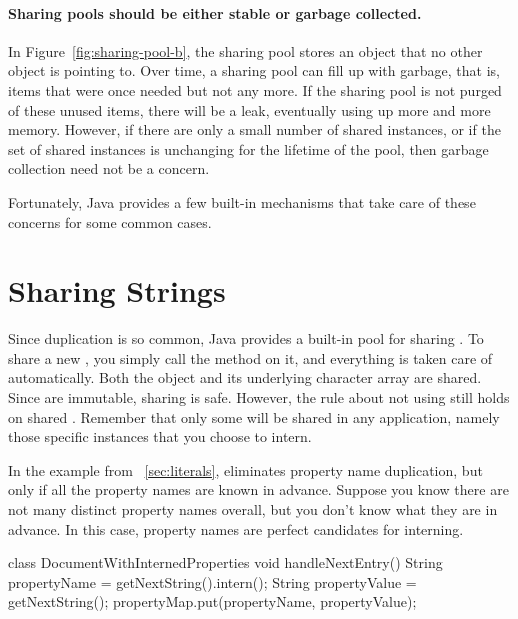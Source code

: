 \paragraph{Sharing pools should be either stable or garbage collected.} 
In Figure~\ref{fig:sharing-pool-b}, the sharing pool stores an object
that no other object is pointing to. Over time, a sharing pool can fill up with
garbage, that is, items that were once needed but not any more. If the
sharing pool is not purged of these unused items, there will be a leak, 
eventually using up more and more memory. However, if there are only a small
number of shared instances, or if the set of shared instances is unchanging for the lifetime of the pool,
then garbage collection need not be a concern.

Fortunately, Java provides a few built-in mechanisms that take care of
these concerns for some common cases.

\section{Sharing Strings}
\label{sec:sharing-strings}


Since  duplication is so common, Java provides a built-in
pool for sharing . To share a new
, you simply call the method  on it, and 
everything is taken care of automatically. Both the 
object and its underlying character array are shared. Since
 are immutable, sharing is safe.
However, the rule about not using \code{==} still holds on shared
.  Remember that only some
 will be shared in any application, namely those specific
instances that you choose to intern.

In the example from ~\autoref{sec:literals},
 eliminates property
name duplication, but only if all the property names are known in advance.
Suppose you know there are not many distinct property names overall, but you
don't know what they are in advance. In this case, property names
are perfect candidates for  interning.
\begin{shortlisting}
 
 class DocumentWithInternedProperties {
    void handleNextEntry() {
       String propertyName = getNextString().intern(); 
       String propertyValue = getNextString();
       propertyMap.put(propertyName, propertyValue);
    }
}
\end{shortlisting}

